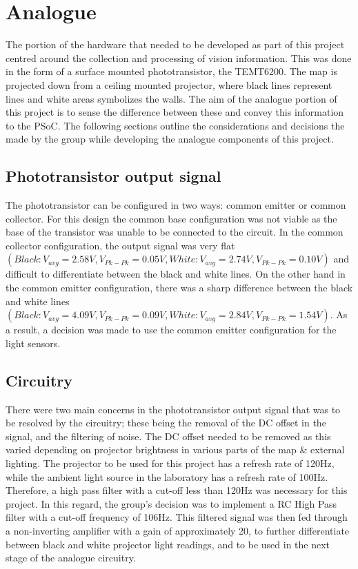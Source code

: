 \documentclass{article}
\begin{document}

\section{Analogue}

The portion of the hardware that needed to be developed as part of this project centred around the collection and processing of vision information. This was done in the form of a surface mounted phototransistor, the TEMT6200. The map is projected down from a ceiling mounted projector, where black lines represent lines and white areas symbolizes the walls. The aim of the analogue portion of this project is to sense the difference between these and convey this information to the PSoC. The following sections outline the considerations and decisions the made by the group while developing the analogue components of this project.

\subsection{Phototransistor output signal}

The phototransistor can be configured in two ways: common emitter or common collector. For this design the common base configuration was not viable as the base of the transistor was unable to be connected to the circuit. In the common collector configuration, the output signal was very flat $(Black: V_{avg} = 2.58V, V_{Pk-Pk} = 0.05V, White: V_{avg} = 2.74V, V_{Pk-Pk} = 0.10V)$ and difficult to differentiate between the black and white lines. On the other hand in the common emitter configuration, there was a sharp difference between the black and white lines $(Black: V_{avg} = 4.09V, V_{Pk-Pk} = 0.09V, White: V_{avg} = 2.84V, V_{Pk-Pk} = 1.54V)$. As a result, a decision was made to use the common emitter configuration for the light sensors.
\subsection{Circuitry}

There were two main concerns in the phototransistor output signal that was to be resolved by the circuitry; these being the removal of the DC offset in the signal, and the filtering of noise. The DC offset needed to be removed as this varied depending on projector brightness in various parts of the map \& external lighting. The projector to be used for this project has a refresh rate of 120Hz, while the ambient light source in the laboratory has a refresh rate of 100Hz. Therefore, a high pass filter with a cut-off less than 120Hz was necessary for this project. In this regard, the group's decision was to implement a RC High Pass filter with a cut-off frequency of 106Hz. This filtered signal was then fed through a non-inverting amplifier with a gain of approximately 20, to further differentiate between black and white projector light readings, and to be used in the next stage of the analogue circuitry. 
\end{document}
